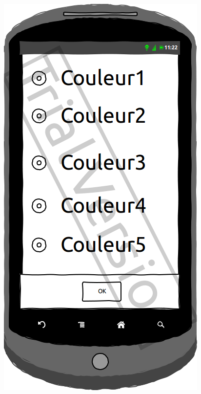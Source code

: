 \documentclass[a4paper, 11px]{article}
\begin{document}
\begin{figure}[htbp]
\begin{minipage}[c]{.32\linewidth}
\begin{center}
			\includegraphics[scale=0.3]{../../Sketch/Android/Design.png}
		\end{center}
	\end{minipage}
\end{figure}
\vfill
\clearpage
\end{document}
